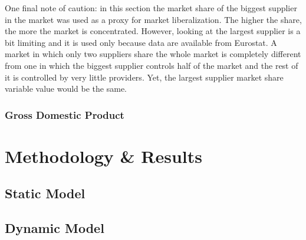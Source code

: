 \documentclass{book}
\begin{document}
One final note of caution: in this section the market share of the biggest supplier in the market was used as a proxy for market liberalization. The higher the share, the more the market is concentrated. However, looking at the largest supplier is a bit limiting and it is used only because data are available from Eurostat. A market in which only two suppliers share the whole market is completely different from one in which the biggest supplier controls half of the market and the rest of it is controlled by very little providers. Yet, the largest supplier market share variable value would be the same.

\subsection*{Gross Domestic Product}

\chapter*{Methodology \& Results}
\section*{Static Model}
\section*{Dynamic Model}

{}

\end{document}
